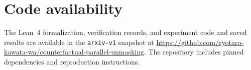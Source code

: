 \section*{Code availability}
\label{sec:code-availability}

The Lean~4 formalization, verification records, and experiment code and saved
results are available in the \texttt{arxiv-v1} snapshot at
\url{https://github.com/ryotaro-kawata-wa/counterfactual-parallel-unmasking}.
The repository includes pinned dependencies and reproduction instructions.
